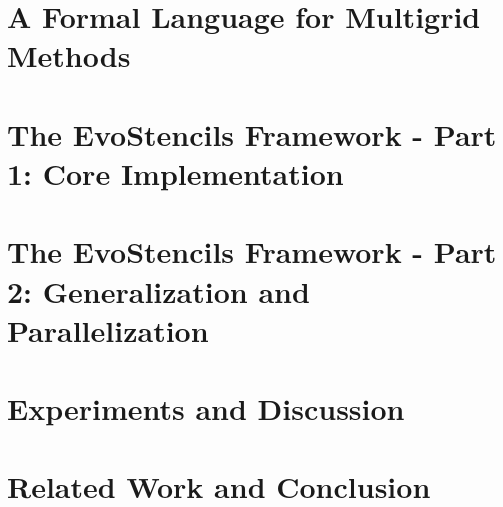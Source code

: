 \documentclass[
  paper = 17x24,
  language = english,
  acronym = split,
  acronymline = novertical,
  bibliography = combined,
  bibliographypart = all,
  titlesize = Huge,
  par = halfskip,
]{faupress}
\theoremstyle{definition}
\numberwithin{equation}{chapter}
\begin{document}
\chapter{A Formal Language for Multigrid Methods}
\label{chapter:multigrid-formal-language}
  
\chapter{The EvoStencils Framework - Part 1: Core Implementation}
\label{chapter:evostencils-1}
  
\chapter{The EvoStencils Framework - Part 2: Generalization and Parallelization}
  \label{chapter:evostencils-2}
  
\chapter{Experiments and Discussion}
\label{chapter:experiments}
  
\chapter{Related Work and Conclusion}
  
  


\appendix 
  
  
    
\backmatter
  \faupressprintbibliography
\end{document}
